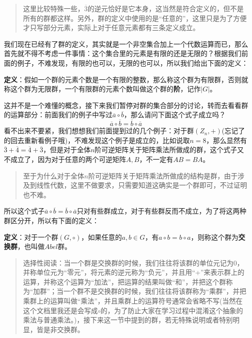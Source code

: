 \documentclass[12pt, a4paper, oneside]{ctexart}
\newenvironment{myquote}{\begin{quote}\small\color{gray}}{\end{quote}}
\begin{document}
\begin{myquote}
这里比较特殊一些，$\overline{3}$的逆元恰好是它本身，这当然是符合定义的，但不是所有的群都这样。另外，群的定义中使用的是“任意的”，这里只是为了方便才只写部分元素，实际上对于任意元素都有三条定义成立。
\end{myquote}

我们现在已经有了群的定义，其实就是一个非空集合加上一个代数运算而已，那么首先就不得不考虑一件事情：这个集合里的元素是有限的还是无限的？根据我们前面的例子，不难发现，有限的也可以，无限的也可以，所以我们给出下面的定义：

\textbf{定义}：假如一个群的元素个数是一个有限的整数，那么称这个群为有限群，否则就称这个群为无限群，一个有限群的元素个数叫做这个群的\textbf{阶}，记作$|G|$。

这并不是一个难懂的概念，接下来我们暂停对群的集合部分的讨论，转而去看看群的运算部分：前面我们的例子中写过$\overline{a}\circ\overline{b}$，那么请问下面这个式子成立吗？
\[
\overline{a}\circ\overline{b}=\overline{b}\circ\overline{a}
\]
看不出来不要紧，我们想想我们前面提到过的几个例子：对于群$(Z_n,+)$(忘记了的回去重新看例子哦)，不难发现这个例子是成立的，比如说取$n=8$，那么显然有$\overline{3}+\overline{4}=\overline{4}+\overline{3}$，但是对于全体$n$阶可逆矩阵关于矩阵乘法所做成的群，这个式子又不成立了，因为对于任意的两个可逆矩阵$A,B$，不一定有$AB=BA$。

\begin{myquote}
至于为什么对于全体$n$阶可逆矩阵关于矩阵乘法所做成的结构是群，由于涉及到线性代数，这里不做要求，只需要知道这确实是一个群即可，不过证明也不难。
\end{myquote}

所以这个式子$\overline{a}\circ\overline{b}=\overline{b}\circ\overline{a}$只对有些群成立，对于有些群反而不成立，为了将这两种群区分开，所以有下面的定义：

\textbf{定义}：对于一个群$(G,\circ)$，如果任意的$a,b\in G$，有$a\circ b=b\circ a$，则称这个群为\textbf{交换群}，也叫做$Abel$群。

\begin{myquote}
选择性阅读：当一个群是交换群的时候，我们往往将该群的单位元记为0，并称单位元为“零元”，将元素的逆元称为“负元”，并且用“+”来表示群上的运算，并称这个运算为“加法”，把运算的结果叫做“和”，并把这个群称为“加群”；当一个群不是交换群的时候，我们往往将该群称为“乘群”，并把乘群上的运算叫做“乘法”，并且乘群上的运算符号通常会省略不写(当然在这个文档里我还是会写成$\circ$的，为了防止大家在学习过程中混淆这个抽象的乘法与普通乘法。)，接下来这一节中提到的群，若无特殊说明或者特别明显，皆是非交换群。
\end{myquote}
\end{document}
